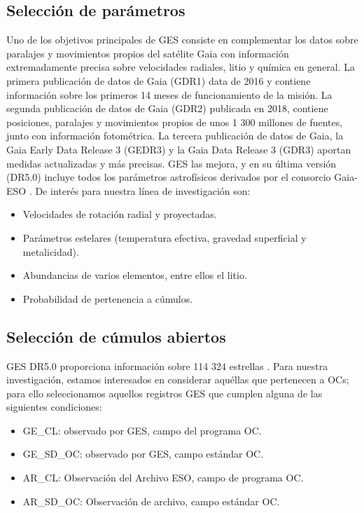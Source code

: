 \subsection{Selección de parámetros}
Uno de los objetivos principales de GES consiste en complementar los datos sobre paralajes y movimientos propios del satélite Gaia con información extremadamente precisa sobre velocidades radiales, litio y química en general. La primera publicación de datos de Gaia (GDR1) \citep{Brown2016} data de 2016 y contiene información sobre los primeros 14 meses de funcionamiento de la misión. La segunda publicación de datos de Gaia (GDR2) \citep{Brown2018} publicada en 2018, contiene posiciones, paralajes y movimientos propios de unos 1 300 millones de fuentes, junto con información fotométrica. La tercera publicación de datos de Gaia, la Gaia Early Data Release 3 (GEDR3) \citep{Brown2021} y la Gaia Data Release 3 (GDR3) \citep{Brown2022} aportan medidas actualizadas y más precisas. GES las mejora, y en su última versión (DR5.0) incluye todos los parámetros astrofísicos derivados por el consorcio Gaia-ESO \citep{Gilmore2022}. De interés para nuestra línea de investigación son:
\begin{itemize}
	\item Velocidades de rotación radial y proyectadas.
	\item Parámetros estelares (temperatura efectiva, gravedad superficial y metalicidad).
	\item Abundancias de varios elementos, entre ellos el litio.
	\item Probabilidad de pertenencia a cúmulos.
\end{itemize}


\subsection{Selección de cúmulos abiertos}
GES DR5.0 proporciona información sobre 114 324 estrellas \citep[véase][para más detalles]{Gilmore2022}. Para nuestra investigación, estamos interesados en considerar aquéllas que pertenecen a OCs; para ello seleccionamos aquellos registros GES que cumplen alguna de las siguientes condiciones:

\begin{itemize}
	\item GE\_CL: observado por GES, campo del programa OC.
	\item GE\_SD\_OC: observado por GES, campo estándar OC.
	\item AR\_CL: Observación del Archivo ESO, campo de programa OC.
	\item AR\_SD\_OC: Observación de archivo, campo estándar OC.
\end{itemize}
	
